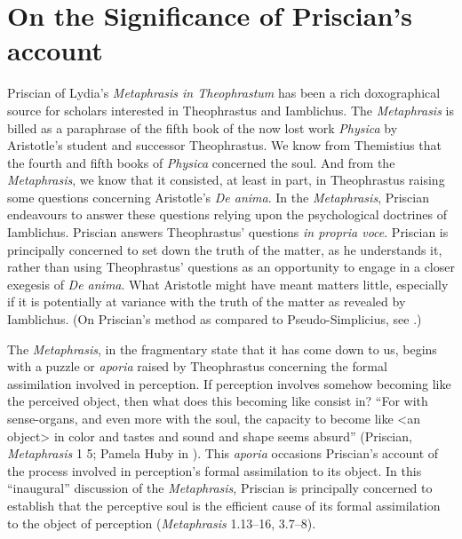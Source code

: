 \documentclass[12pt]{article}
\title{\mytitle}
\author{\myauthor}
\date{} %
\begin{document}
\maketitle

\setlength{\parindent}{1em}


\section{On the Significance of Priscian's account} %
\label{sec:on_the_significance_of_priscian_s_account}

Priscian of Lydia's \emph{Metaphrasis in Theophrastum} has been a rich doxographical source for scholars interested in Theophrastus and Iamblichus. The \emph{Metaphrasis} is billed as a paraphrase of the fifth book of the now lost work \emph{Physica} by Aristotle's student and successor Theophrastus. We know from Themistius that the fourth and fifth books of \emph{Physica} concerned the soul. And from the \emph{Metaphrasis}, we know that it consisted, at least in part, in Theophrastus raising some questions concerning Aristotle's \emph{De anima}. In the \emph{Metaphrasis}, Priscian endeavours to answer these questions relying upon the psychological doctrines of Iamblichus. Priscian answers Theophrastus' questions \emph{in propria voce}. Priscian is principally concerned to set down the truth of the matter, as he understands it, rather than using Theophrastus' questions as an opportunity to engage in a closer exegesis of \emph{De anima}. What Aristotle might have meant matters little, especially if it is potentially at variance with the truth of the matter as revealed by Iamblichus. (On Priscian's method as compared to Pseudo-Simplicius, see \citealt[7--10]{Steel:1978th}.)

The \emph{Metaphrasis}, in the fragmentary state that it has come down to us, begins with a puzzle or \emph{aporia} raised by Theophrastus concerning the formal assimilation involved in perception. If perception involves somehow becoming like the perceived object, then what does this becoming like consist in? ``For with sense-organs, and even more with the soul, the capacity to become like <an object> in color and tastes and sound and shape seems absurd'' (Priscian, \emph{Metaphrasis} 1 5; Pamela Huby in \citealt{Sorabji:1997ly}). This \emph{aporia} occasions Priscian's account of the process involved in perception's formal assimilation to its object. In this ``inaugural'' discussion of the \emph{Metaphrasis}, Priscian is principally concerned to establish that the perceptive soul is the efficient cause of its formal assimilation to the object of perception (\emph{Metaphrasis} 1.13--16, 3.7--8).
\end{document}
